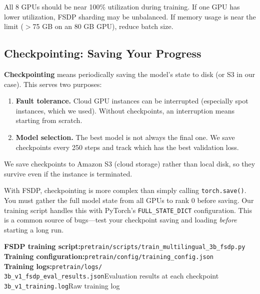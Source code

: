 \documentclass[11pt,a4paper]{article}
\begin{document}
All 8 GPUs should be near 100\% utilization during training. If one GPU has lower utilization, FSDP sharding may be unbalanced. If memory usage is near the limit ($>$75 GB on an 80 GB GPU), reduce batch size.

\subsection{Checkpointing: Saving Your Progress}

\textbf{Checkpointing} means periodically saving the model's state to disk (or S3 in our case). This serves two purposes:

\begin{enumerate}
    \item \textbf{Fault tolerance.} Cloud GPU instances can be interrupted (especially spot instances, which we used). Without checkpoints, an interruption means starting from scratch.
    \item \textbf{Model selection.} The best model is not always the final one. We save checkpoints every 250 steps and track which has the best validation loss.
\end{enumerate}

We save checkpoints to Amazon S3 (cloud storage) rather than local disk, so they survive even if the instance is terminated.

\begin{warning}
With FSDP, checkpointing is more complex than simply calling \texttt{torch.save()}. You must gather the full model state from all GPUs to rank 0 before saving. Our training script handles this with PyTorch's \texttt{FULL\_STATE\_DICT} configuration. This is a common source of bugs---test your checkpoint saving and loading \emph{before} starting a long run.
\end{warning}

\begin{reporef}
\textbf{FSDP training script:}\hfill\texttt{pretrain/scripts/train\_multilingual\_3b\_fsdp.py}\\
\textbf{Training configuration:}\hfill\texttt{pretrain/config/training\_config.json}\\
\textbf{Training logs:}\hfill\texttt{pretrain/logs/}\\
\quad\texttt{3b\_v1\_fsdp\_eval\_results.json}\hfill Evaluation results at each checkpoint\\
\quad\texttt{3b\_v1\_training.log}\hfill Raw training log\\
\end{reporef}
\end{document}
